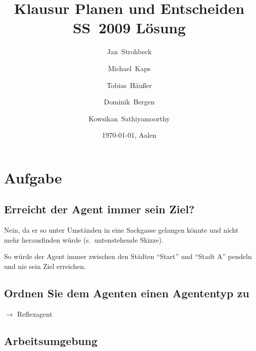 \documentclass[a4paper,draft=false,oneside,12pt,ngerman]{scrreprt}
\title{Klausur Planen und Entscheiden SS~2009 Lösung}
\author{Jan~Strohbeck \and Michael~Kaps \and Tobias~Häußer \and Dominik~Bergen \and Kowsikan~Sathiyamoorthy}
\date{\today{}, Aalen}
\begin{document}
\pagestyle{empty}
\renewcommand*{\chapterpagestyle}{scrheadings}


\cleardoublepage{}
\renewcommand*{\chapterpagestyle}{scrheadings}
\pagestyle{scrheadings}


\chapter{Aufgabe}
\label{chp:aufgabe_1}

\section{Erreicht der Agent immer sein Ziel?}
\label{sec:erreicht_der_agent_immer_sein_ziel?}

Nein, da er so unter Umständen in eine Sackgasse gelangen könnte und nicht mehr
herausfinden würde (s.\ untenstehende Skizze).

\begin{center}
\vspace{0.4cm}
\end{center}

So würde der Agent immer zwischen den Städten \enquote{Start} und \enquote{Stadt
A} pendeln und nie sein Ziel erreichen.

\section{Ordnen Sie dem Agenten einen Agententyp zu}
\label{sec:ordnen_sie_dem_agenten_einen_agententyp_zu}

$\rightarrow$ Reflexagent

\section{Arbeitsumgebung}
\label{sec:arbeitsumgebung}
\end{document}
